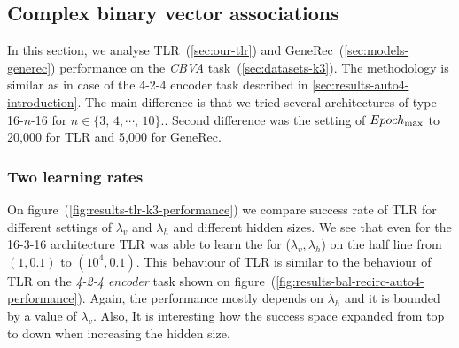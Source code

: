 

\subsection{Complex binary vector associations} 
\label{sec:results-k3}

In this section, we analyse TLR~(\ref{sec:our-tlr}) and GeneRec~(\ref{sec:models-generec}) performance on the \emph{CBVA} task~(\ref{sec:datasets-k3}). The methodology is similar as in case of the 4-2-4 encoder task described in \ref{sec:results-auto4-introduction}. The main difference is that we tried several architectures of type 16-$n$-16 for $n \in \{3,\,4,\cdots,\,10\}.$. Second difference was the setting of $Epoch_{\rm max}$ to 20,000 for TLR and 5,000 for GeneRec. 

\subsubsection{Two learning rates} 
\label{sec:tlr-k3}

On figure~(\ref{fig:results-tlr-k3-performance}) we compare success rate of TLR for different settings of $\lambda_v$ and $\lambda_h$ and different hidden sizes. We see that even for the 16-3-16 architecture TLR was able to learn the for ($\lambda_v, \lambda_h$) on the half line from  $(1, 0.1)$ to $(10^4, 0.1)$. This behaviour of TLR is similar to the behaviour of TLR on the \emph{4-2-4 encoder} task shown on figure~(\ref{fig:results-bal-recirc-auto4-performance}). Again, the performance mostly depends on $\lambda_h$ and it is bounded by a value of $\lambda_v$. Also, It is interesting how the success space expanded from top to down when increasing the hidden size.


